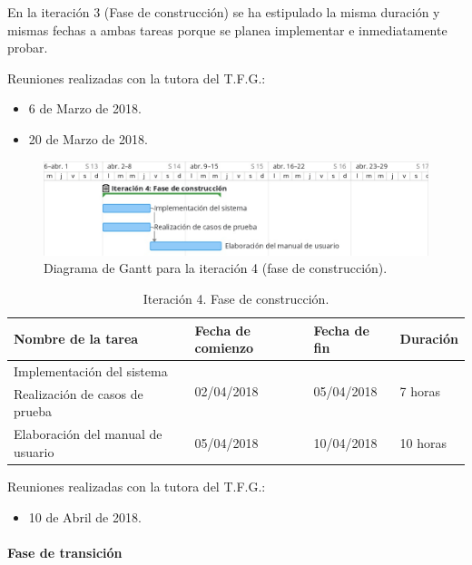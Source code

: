 \documentclass[twoside]{report}
\begin{document}
En la iteración 3 (Fase de construcción) se ha estipulado la misma duración y mismas fechas a ambas tareas porque se planea implementar e inmediatamente probar.

Reuniones realizadas con la tutora del T.F.G.:
\begin{itemize}
\item 6 de Marzo de 2018.
\item 20 de Marzo de 2018.
\end{itemize}


\begin{figure}[h]
\begin{center}
\includegraphics[width=\textwidth]{images/gantt/ite4}
\caption{Diagrama de Gantt para la iteración 4 (fase de construcción).}
\end{center}
\end{figure}

\begin{table}[H]
\centering
\begin{tabular}{|l|l|l|l|}
\hline
Nombre de la tarea                & Fecha de comienzo & Fecha de fin & Duración \\ \hline
Implementación del sistema        & \multirow{2}{*}{02/04/2018} & \multirow{2}{*}{05/04/2018}   & \multirow{2}{*}{7 horas}  \\
Realización de casos de prueba    & &   &   \\ \hline
Elaboración del manual de usuario & 05/04/2018        & 10/04/2018   & 10 horas   \\ \hline

\end{tabular}
\caption{Iteración 4. Fase de construcción.}
\end{table}

Reuniones realizadas con la tutora del T.F.G.:
\begin{itemize}
\item 10 de Abril de 2018.
\end{itemize}

\paragraph{Fase de transición}\mbox{}\\
\end{document}
